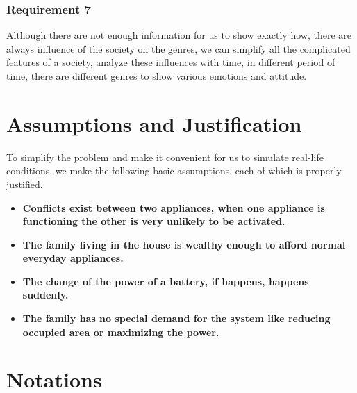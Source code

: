 \documentclass{article}
\begin{document}
\subsubsection{Requirement 7}
Although there are not enough information for us to show exactly how, there are always influence of the society on the genres, we can simplify all the complicated features
of a society, analyze these influences with time, in different period of time, there are different genres to show various emotions and attitude.

\section{Assumptions and Justification}

To simplify the problem and make it convenient for us to simulate real-life conditions, we make the following basic assumptions, each of which is properly justified.

\begin{itemize}
    \item {\bf Conflicts exist between two appliances, when one appliance is functioning the other is very unlikely to be activated.}
    \item {\bf The family living in the house is wealthy enough to afford normal everyday appliances.}

    \item {\bf The change of the power of a battery, if happens,  happens suddenly.}

    \item {\bf The family has no special demand for the system like reducing occupied area or maximizing the power.}

\end{itemize}
\section{Notations}
\end{document}
